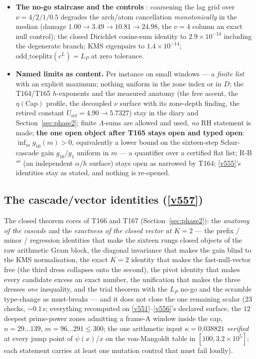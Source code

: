 \documentclass[11pt,a4paper]{article}
\begin{document}
\begin{itemize}[leftmargin=1.5em]
$g_8$ in place of $g_{16}$ breaks by $0.10$--$0.24$; a corrupted off-diagonal
sixteen-block entry makes the Cholesky \emph{refuse} on $12/12$.
\item \textbf{The no-go staircase and the controls} \mE: coarsening the lag grid over
$\nu=4/2/1/0.5$ degrades the arch/atom cancellation \emph{monotonically} in the median
(damage $1.00\to3.49\to10.81\to24.98$, the $\nu=4$ column an exact null control); the
closed Dirichlet cosine-sum identity to $2.9\times10^{-14}$ including the degenerate
branch; KMS eigenpairs to $1.4\times10^{-14}$; $\mathrm{odd\_toeplitz}(c^L)=L_P$ at
zero tolerance.
\item \textbf{Named limits as content.} Per instance on small windows --- a \emph{finite
list} with an explicit maximum; nothing uniform in the zone index or in $D$; the
T164/T165 $h$-exponents and the measured anatomy (the free ascent, the
$\eta(\mathrm{Cap})$ profile, the decoupled $\nu$ surface with its zone-depth finding,
the retired constant $U_{\mathrm{ref}}=4.90\to5.7327$) stay in the diary and
Section~\ref{sec:phase2}; finite $\Lambda$-sums are allowed and used, \emph{no} RH
statement is made; \textbf{the one open object after T165 stays open and typed open}:
$\inf_m g_{16}(m)>0$, equivalently a lower bound on the sixteen-step Schur-cascade gain
$g_{16}/g_1$ uniform in $m$ --- a quantifier over a certified flat list; R-B$'''$ (an
independent $\alpha$/$h$ surface) stays open as narrowed by T164; \vref{v555}'s
identities stay as stated, and nothing is re-opened.
\end{itemize}

\subsection{The cascade/vector identities (\texorpdfstring{\vref{v557}}{v557})}\label{sec:v557}
The closed theorem cores of T166 and T167 (Section~\ref{sec:phase2}): the \emph{anatomy of
the cascade} and the \emph{exactness of the closed vector at $K=2$} --- the prefix / minor /
regression identities that make the sixteen rungs closed objects of the raw arithmetic Gram
block, the diagonal invariance that makes the gain blind to the KMS normalisation, the exact
$K=2$ identity that makes the fast-null-vector free (the third dress collapses onto the
second), the pivot identity that makes every candidate excess an exact number, the
unification that makes the three dresses \emph{one} inequality, and the trial theorem with
the $L_P$ no-go and the scramble type-change as must-breaks --- and it does not close the one
remaining scalar
 ($23$ checks, ${\sim}0.1$\,s; everything
recomputed on \vref{v551}--\vref{v556}'s declared surface, the $12$ deepest prime-power zones
admitting a frame-A window inside the cap, $n=29\ldots139$, $m=96\ldots291\le300$; the one
arithmetic input $\kappa=0.038821$ \emph{verified} at every jump point of $\psi(x)/x$ on the
von-Mangoldt table in $[100,3.2\times10^{5}]$; each statement carries at least one mutation
control that must fail loudly).
\end{document}
